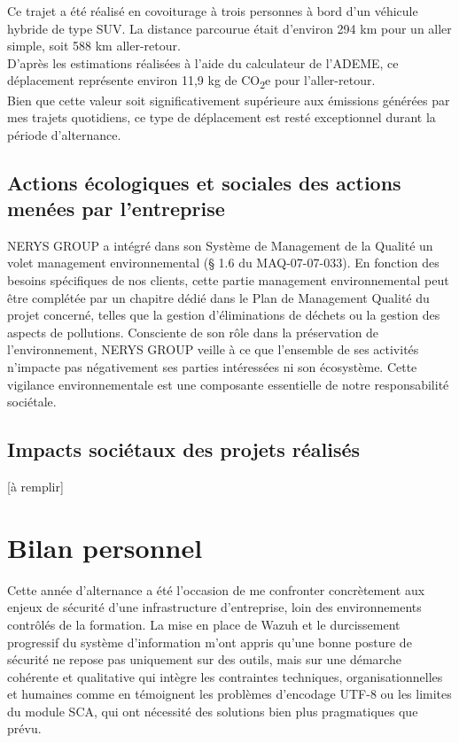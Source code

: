 \documentclass[a4paper, 11pt]{article}
\begin{document}
Ce trajet a été réalisé en covoiturage à trois personnes à bord d'un véhicule hybride de type SUV. La distance parcourue était d'environ 294 km pour un aller simple, soit 588 km aller-retour.\\

D'après les estimations réalisées à l'aide du calculateur de l'ADEME, ce déplacement représente environ 11,9 kg de CO\textsubscript{2}e pour l'aller-retour.\\

Bien que cette valeur soit significativement supérieure aux émissions générées par mes trajets quotidiens, ce type de déplacement est resté exceptionnel durant la période d'alternance.



\subsection{Actions écologiques et sociales des actions menées par l'entreprise}

NERYS GROUP a intégré dans son Système de Management de la Qualité un volet
management environnemental (§ 1.6 du MAQ-07-07-033). En fonction des besoins spécifiques de
nos clients, cette partie management environnemental peut être complétée par un chapitre dédié
dans le Plan de Management Qualité du projet concerné, telles que la gestion d’éliminations de
déchets ou la gestion des aspects de pollutions.
Consciente de son rôle dans la préservation de l’environnement, NERYS GROUP veille à ce
que l’ensemble de ses activités n’impacte pas négativement ses parties intéressées ni son
écosystème. Cette vigilance environnementale est une composante essentielle de notre
responsabilité sociétale.


\subsection{Impacts sociétaux des projets réalisés}

[à remplir]




\section{Bilan personnel}

Cette année d'alternance a été l'occasion de me confronter concrètement aux enjeux de sécurité d'une infrastructure d'entreprise, loin des environnements contrôlés
 de la formation. La mise en place de Wazuh et le durcissement progressif du système d'information m'ont appris qu'une bonne posture de sécurité ne repose pas 
 uniquement sur des outils, mais sur une démarche cohérente et qualitative qui intègre les contraintes techniques, organisationnelles et humaines comme en témoignent les problèmes 
 d'encodage UTF-8 ou les limites du module SCA, qui ont nécessité des solutions bien plus pragmatiques que prévu.
  \par\bigskip
\end{document}
